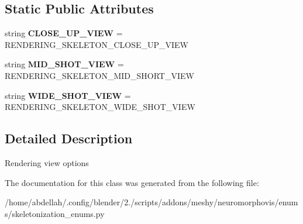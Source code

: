 \subsection*{Static Public Attributes}
\begin{DoxyCompactItemize}
\item 
string {\bfseries C\+L\+O\+S\+E\+\_\+\+U\+P\+\_\+\+V\+I\+EW} = \textquotesingle{}R\+E\+N\+D\+E\+R\+I\+N\+G\+\_\+\+S\+K\+E\+L\+E\+T\+O\+N\+\_\+\+C\+L\+O\+S\+E\+\_\+\+U\+P\+\_\+\+V\+I\+EW\textquotesingle{}\hypertarget{classmeshy_1_1neuromorphovis_1_1enums_1_1skeletonization__enums_1_1Skeletonization_1_1Rendering_1_1View_a276aed1e244f8a08b45b5896a2e4bfb7}{}\label{classmeshy_1_1neuromorphovis_1_1enums_1_1skeletonization__enums_1_1Skeletonization_1_1Rendering_1_1View_a276aed1e244f8a08b45b5896a2e4bfb7}

\item 
string {\bfseries M\+I\+D\+\_\+\+S\+H\+O\+T\+\_\+\+V\+I\+EW} = \textquotesingle{}R\+E\+N\+D\+E\+R\+I\+N\+G\+\_\+\+S\+K\+E\+L\+E\+T\+O\+N\+\_\+\+M\+I\+D\+\_\+\+S\+H\+O\+R\+T\+\_\+\+V\+I\+EW\textquotesingle{}\hypertarget{classmeshy_1_1neuromorphovis_1_1enums_1_1skeletonization__enums_1_1Skeletonization_1_1Rendering_1_1View_a2ce06b086e7589457f4068a4762c2166}{}\label{classmeshy_1_1neuromorphovis_1_1enums_1_1skeletonization__enums_1_1Skeletonization_1_1Rendering_1_1View_a2ce06b086e7589457f4068a4762c2166}

\item 
string {\bfseries W\+I\+D\+E\+\_\+\+S\+H\+O\+T\+\_\+\+V\+I\+EW} = \textquotesingle{}R\+E\+N\+D\+E\+R\+I\+N\+G\+\_\+\+S\+K\+E\+L\+E\+T\+O\+N\+\_\+\+W\+I\+D\+E\+\_\+\+S\+H\+O\+T\+\_\+\+V\+I\+EW\textquotesingle{}\hypertarget{classmeshy_1_1neuromorphovis_1_1enums_1_1skeletonization__enums_1_1Skeletonization_1_1Rendering_1_1View_a258d7afc6cbb0775c2d6c0bcdf731d79}{}\label{classmeshy_1_1neuromorphovis_1_1enums_1_1skeletonization__enums_1_1Skeletonization_1_1Rendering_1_1View_a258d7afc6cbb0775c2d6c0bcdf731d79}

\end{DoxyCompactItemize}


\subsection{Detailed Description}


\begin{DoxyVerb}Rendering view options
\end{DoxyVerb}
 

The documentation for this class was generated from the following file\+:\begin{DoxyCompactItemize}
\item 
/home/abdellah/.\+config/blender/2./scripts/addons/meshy/neuromorphovis/enums/skeletonization\+\_\+enums.\+py\end{DoxyCompactItemize}
